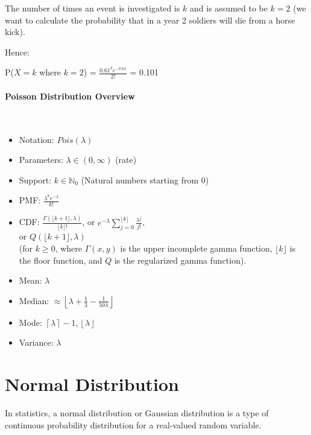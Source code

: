 \documentclass{article}
\begin{document}
The number of times an event is investigated is $k$ and is assumed to be $k = 2$ (we want to calculate the probability that in a year 2 soldiers will die from a horse kick).

Hence: 

P($X = k$ where $k = 2$) = $ \displaystyle \frac {0.61^{2}e^{-0.61 }}{2!} $ = 0.101 

\paragraph{Poisson Distribution Overview}\mbox{} \\

\begin{itemize}
    \item Notation: $Pois(\lambda)$
    \item Parameters: $ \displaystyle \lambda \in (0,\infty)$ (rate)
    \item Support: $ \displaystyle k\in \mathbb {N} _{0}$ (Natural numbers starting from 0) 
    \item PMF: $ \displaystyle {\frac {\lambda ^{k}e^{-\lambda }}{k!}} $
    \item CDF: $ \displaystyle {\frac {\Gamma (\lfloor k+1\rfloor ,\lambda )}{\lfloor k\rfloor !}}$, or $\displaystyle e^{-\lambda }\sum _{j=0}^{\lfloor k\rfloor }{\frac {\lambda ^{j}}{j!}}$, \\ or $\displaystyle Q(\lfloor k+1\rfloor ,\lambda )$ \\ (for $\displaystyle k\geq 0$, where $\Gamma (x,y)$ is the upper incomplete gamma function, $ \displaystyle \lfloor k\rfloor $ is the floor function, and $Q$ is the regularized gamma function).
    \item Mean: $\lambda$
    \item Median: $ \displaystyle \approx \left\lfloor \lambda +{\frac {1}{3}}-{\frac {1}{50\lambda }}\right\rfloor $
    \item Mode: $ \displaystyle \left\lceil \lambda \right\rceil -1,\left\lfloor \lambda \right\rfloor $
    \item Variance: $ \lambda $ 
\end{itemize}

\clearpage

\section{Normal Distribution}
In statistics, a normal distribution or Gaussian distribution is a type of continuous probability distribution for a real-valued random variable. 
\end{document}
